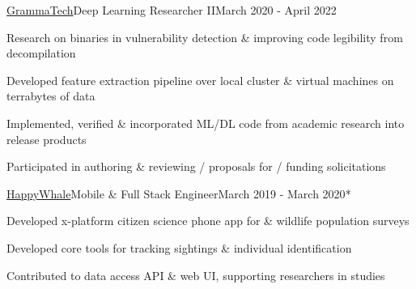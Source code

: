 \documentclass{article}
\newcommand{\LU}[1]{\hspace{-1em}{\bf Technologies : #1}}
\begin{document}
\begin{**mylist}[Security]{\href{https://www.grammatech.com}{GrammaTech}}{Deep Learning Researcher II}{March 2020 - April 2022}
\item Research on binaries in vulnerability detection \& improving code legibility from decompilation
\item Developed feature extraction pipeline over local cluster \& virtual machines on terrabytes of data
\item Implemented, verified \& incorporated ML/DL code from academic research into release products
\item Participated in authoring \& reviewing / proposals for / funding solicitations
\end{**mylist}

\begin{**mylist}{\href{www.happywhale.com}{HappyWhale}}{Mobile \& Full Stack Engineer}{March 2019 - March 2020}*
\item Developed %
  x-platform citizen science phone app
  for
   \& wildlife population  surveys
\item Developed core tools for tracking  sightings \& individual  identification
\item Contributed to data access API \& web UI, supporting researchers in  studies
\end{**mylist}
\end{document}
